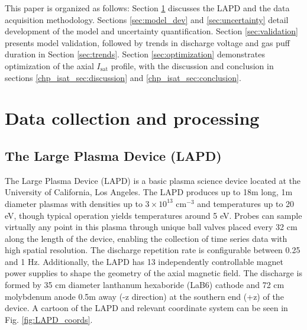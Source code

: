 This paper is organized as follows: Section \ref{sec:data} discusses the LAPD and the data acquisition methodology. Sections \ref{sec:model_dev} and \ref{sec:uncertainty} detail development of the model and uncertainty quantification. Section \ref{sec:validation} presents model validation, followed by trends in discharge voltage and gas puff duration in Section \ref{sec:trends}. Section \ref{sec:optimization} demonstrates optimization of the axial $I_\text{sat}$ profile, with the discussion and conclusion in sections \ref{chp_isat_sec:discussion} and \ref{chp_isat_sec:conclusion}. 

\section{Data collection and processing}
\label{sec:data}

\subsection{The Large Plasma Device (LAPD)}


The Large Plasma Device (LAPD)\cite{gekelman_upgraded_2016,qian_design_2023} is a basic plasma science device located at the University of California, Los Angeles. The LAPD produces up to 18m long, 1m diameter plasmas  with densities up to $3 \times 10^{13}$ cm$^{-3}$ and temperatures up to 20 eV, though typical operation yields temperatures around 5 eV. Probes can sample virtually any point in this plasma through  unique ball valves placed every 32 cm along the length of the device, enabling the collection of time series data with high spatial resolution. The discharge repetition rate is configurable between 0.25 and 1 Hz. Additionally, the LAPD has 13 independently controllable magnet power supplies to shape the geometry of the axial magnetic field. The discharge is formed by 35 cm diameter lanthanum hexaboride (LaB6) cathode\cite{qian_design_2023} and 72 cm molybdenum anode 0.5m away (-z direction) at the southern end (+z) of the device. A cartoon of the LAPD and relevant coordinate system can be seen in Fig. \ref{fig:LAPD_coords}. 

